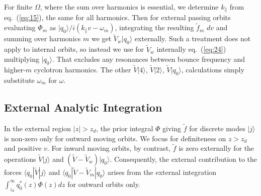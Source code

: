 \documentclass[12pt]{article}
\def\ket#1{|#1\rangle}
\def\bra#1{\langle#1}
\begin{document}
For finite $\Omega$, where the sum over harmonics is essential, we
determine $k_\parallel$ from eq.\ (\ref{eq:15}), the same for all
harmonics. Then for external passing orbits evaluating $\Phi_m$ as
$\ket{q_0}/i(k_\parallel v -\omega_m)$, integrating the resulting
$\tilde f_m$ $dv$ and summing over harmonics $m$ we get
$\tilde V_w\ket{q_0}$ externally. Such a treatment does not
apply to internal orbits, so instead we use for $\tilde V_w$ internally
eq.\ (\ref{eq:24}) multiplying $\ket{q_0}$. That excludes any resonances
between bounce frequency and higher-$m$ cyclotron harmonics. The other
$\tilde V\ket{4}$, $\tilde V\ket{2}$, $\tilde V\ket{q_0}$, calculations
simply substitute $\omega_m$ for $\omega$.

\subsection{External Analytic Integration}

In the external region $|z|>z_d$, the prior integral $\Phi$ giving
$\tilde f$ for discrete modes $\ket{j}$ is non-zero only for outward
moving orbits. We focus for definiteness on $z>z_d$ and positive $v$.
For inward moving orbits, by contrast, $\tilde f$ is zero externally
for the operations $\tilde V\ket{j}$ and
$(\tilde V -\tilde V_w)\ket{q_0}$. Consequently, the external
contribution to the forces $\bra{q_0}|\tilde V \ket{j}$ and
$\bra{q_0}|\tilde V -\tilde V_m\ket{q_0}$ arises from the external
integration $\int_{z_d}^\infty q_0^*(z) \Phi(z) dz$ for outward orbits
only.
\end{document}
